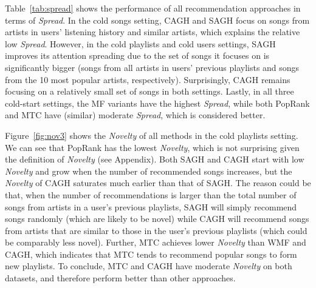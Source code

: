Table~\ref{tab:spread} shows the performance of all recommendation approaches in terms of \emph{Spread}.
In the cold songs setting, CAGH and SAGH focus on songs from artists in users' listening history and similar artists, 
which explains the relative low \emph{Spread}.
However, in the cold playlists and cold users settings, 
SAGH improves its attention spreading due to the set of songs it focuses on is significantly bigger 
(\ie songs from all artists in users' previous playlists and songs from the 10 most popular artists, respectively).
Surprisingly, CAGH remains focusing on a relatively small set of songs in both settings.
Lastly, in all three cold-start settings, the MF variants have the highest \emph{Spread},
while both PopRank and MTC have (similar) moderate \emph{Spread},
which is considered better. %




Figure~\ref{fig:nov3} shows the \emph{Novelty} of all methods in the cold playlists setting.
We can see that PopRank has the lowest \emph{Novelty},
which is not surprising given the definition of \emph{Novelty} (see Appendix).
Both SAGH and CAGH start with low \emph{Novelty} and grow when the number of recommended songs increases,
but the \emph{Novelty} of CAGH saturates much earlier than that of SAGH.
The reason could be that,
when the number of recommendations is larger than the total number of songs from artists in a user's previous playlists,
SAGH will simply recommend songs randomly (which are likely to be novel)
while CAGH will recommend songs from artists that are similar to those in the user's previous playlists
(which could be comparably less novel).
Further, MTC achieves lower \emph{Novelty} than WMF and CAGH, 
which indicates that MTC tends to recommend popular songs to form new playlists. %
To conclude, 
MTC and CAGH have moderate \emph{Novelty} on both datasets,
and therefore perform better than other approaches.

